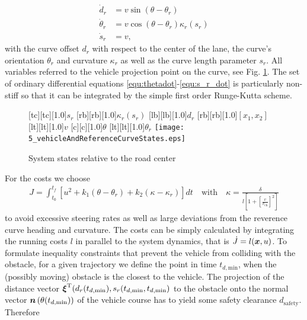 \begin{subequations} \label{equ:dgl_mdl_nmpc_2}
\begin{align}
\label{equ:d_r_dot}
\dot d_r &= v \sin(\theta - \theta_r) \\
\dot \theta_r &= v \cos(\theta - \theta_r)\kappa_r(s_r) \\
\label{equ:s_r_dot}
\dot s_r &= v,
\end{align}
\end{subequations}
with the curve offset $d_r$ with respect to the center of the lane, the curve’s orientation $\theta_r$ and curvature $\kappa_r$  as well as the curve length parameter $s_r$.
All variables referred to the vehicle projection point on the curve, see Fig. \ref{fig:systemStates}. The set of ordinary differential equations \eqref{equ:thetadot}-\eqref{equ:s_r_dot} is particularly non-stiff so that it can be integrated by the simple first order Runge-Kutta scheme.
\begin{figure}[h]%
\centering
{}[tc][tc][1.0]{$s_r$}
    [rb][rb][1.0]{$\kappa_r(s_r)$}
    [lb][lb][1.0]{$d_r$}
    [rb][rb][1.0]{$[x_1, x_2]$}
    [lt][lt][1.0]{$v$}
    [c][c][1.0]{$\theta$}
    [lt][lt][1.0]{$\theta_r$}
    \texttt{[image: 5\_vehicleAndReferenceCurveStates.eps]}
    \caption[System states]{System states relative to the road center}
    \label{fig:systemStates}
\end{figure}%
For the costs we choose
\begin{align}
\label{equ:integralcosts}
J = \int_{t_0}^{t_f}{ \left[ u^2 + k_1 (\theta-\theta_r)+k_2(\kappa - \kappa_r) \right] }dt \quad \text{with} \quad  \kappa = \frac{\delta}{l \left[ 1 + \left[\frac{v}{v_{\text{ch}}}\right]^2\right]}
\end{align}
to avoid excessive steering rates as well as large deviations from the reverence curve heading and curvature. The costs can be simply calculated by integrating the running costs $l$ in parallel to the system dynamics, that is $\dot{J}=l(\boldsymbol{x},u)$.
To formulate inequality constraints that prevent the vehicle from colliding with the obstacle, for a given trajectory we define the point in time $t_{d,\mathrm{min}}$, when the (possibly moving) obstacle is the closest to the vehicle. 
The projection of the distance vector $\boldsymbol{\xi}^{{\rm T}}(d_r(t_{d,\mathrm{min}}),s_r(t_{d,\mathrm{min}},t_{d,\mathrm{min}})$ to the obstacle onto the normal vector $\boldsymbol{n}\left(\theta(t_{d,\mathrm{min}})\right)$ of the vehicle course has to yield some safety clearance $d_\mathrm{safety}$. Therefore

